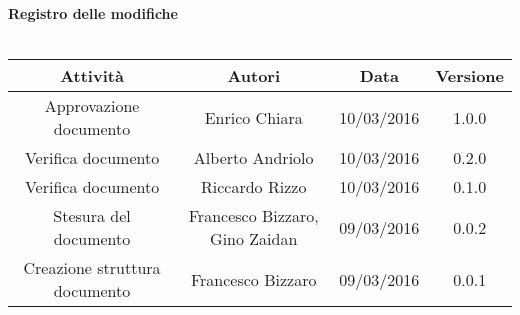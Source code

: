 \vspace{1cm}
   {\fontsize{15pt}{16pt}\selectfont \textbf{Registro delle modifiche}}\\ \\

\bgroup
\def\arraystretch{1.6}
\begin{tabular}{| c | c | c | c |}
\hline
\textbf{Attività} & \textbf{Autori} & \textbf{Data} & \textbf{Versione}\\ \hline \hline


Approvazione documento & Enrico Chiara & 10/03/2016 & 1.0.0 
\\ 
\hline  

Verifica documento & Alberto Andriolo & 10/03/2016 & 0.2.0 \\ 
\hline

Verifica documento & Riccardo Rizzo & 10/03/2016 & 0.1.0 \\ \hline

Stesura del documento & Francesco Bizzaro, Gino Zaidan & 09/03/2016 & 0.0.2 \\ 
\hline

Creazione struttura documento & Francesco Bizzaro & 09/03/2016 & 0.0.1 \\ 
\hline


\end{tabular}
\egroup
\newpage